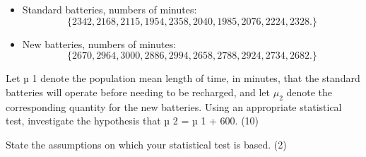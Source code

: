 \documentclass[a4paper,12pt]{article}
\begin{document}
 \begin{itemize}
     \item    Standard batteries, numbers of minutes: 
\[\{ 2342,   2168,   2115,   1954,   2358,   2040,   1985,   2076,   2224,   2328. \}\]
 
\item   New batteries, numbers of minutes: 
\[\{ 2670,   2964,   3000,   2886,   2994,   2658,   2788,   2924,   2734,   2682. \}\]
 \end{itemize}

 
Let µ 1 denote the population mean length of time, in minutes, that the standard batteries will operate before needing to be recharged, and let $\mu_2$ denote the corresponding quantity for the new batteries.  Using an appropriate statistical test, investigate the hypothesis that µ 2 = µ 1 + 600. (10) 
 
State the assumptions on which your statistical test is based. 
(2) 
\end{document}
